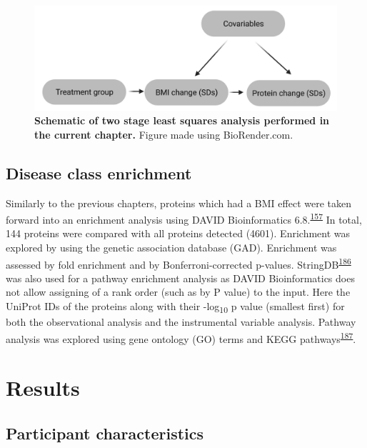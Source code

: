 \documentclass[11pt,twoside]{bristolthesis}
\begin{document}
\begin{figure}
\includegraphics{figure/DiRECT/DiRECT_analysis} \caption[Schematic of two stage least squares analysis performed using DiRECT data]{\textbf{Schematic of two stage least squares analysis performed in the current chapter.} Figure made using BioRender.com.}\label{fig:direct-tsls}
\end{figure}
\hypertarget{disease-class-enrichment}{%
\subsection{Disease class enrichment}\label{disease-class-enrichment}}

Similarly to the previous chapters, proteins which had a BMI effect were taken forward into an enrichment analysis using DAVID Bioinformatics 6.8.\textsuperscript{\protect\hyperlink{ref-Huang2009}{157}} In total, 144 proteins were compared with all proteins detected (4601). Enrichment was explored by using the genetic association database (GAD). Enrichment was assessed by fold enrichment and by Bonferroni-corrected p-values. StringDB\textsuperscript{\protect\hyperlink{ref-Szklarczyk2021}{186}} was also used for a pathway enrichment analysis as DAVID Bioinformatics does not allow assigning of a rank order (such as by P value) to the input. Here the UniProt IDs of the proteins along with their -log\textsubscript{10} p value (smallest first) for both the observational analysis and the instrumental variable analysis. Pathway analysis was explored using gene ontology (GO) terms and KEGG pathways\textsuperscript{\protect\hyperlink{ref-Kanehisa2016}{187}}.

\hypertarget{results-4}{%
\section{Results}\label{results-4}}

\hypertarget{participant-characteristics-2}{%
\subsection{Participant characteristics}\label{participant-characteristics-2}}
\end{document}
